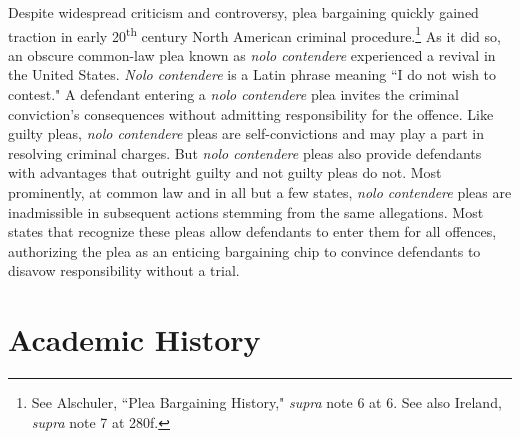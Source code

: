Despite widespread criticism and controversy, plea bargaining quickly gained traction in early 20\textsuperscript{th} century North American criminal procedure.\footnote{See Alschuler, ``Plea Bargaining History," \textit{supra} note 6 at 6. See also Ireland, \textit{supra} note 7 at 280f.} As it did so, an obscure common-law plea known as \textit{nolo contendere} experienced a revival in the United States. \textit{Nolo contendere} is a Latin phrase meaning ``I do not wish to contest." A defendant entering a \textit{nolo contendere} plea invites the criminal conviction's consequences without admitting responsibility for the offence. Like guilty pleas, \textit{nolo contendere} pleas are self-convictions and may play a part in resolving criminal charges. But \textit{nolo contendere} pleas also provide defendants with advantages that outright guilty and not guilty pleas do not. Most prominently, at common law and in all but a few states, \textit{nolo contendere} pleas are inadmissible in subsequent actions stemming from the same allegations. Most states that recognize these pleas allow defendants to enter them for all offences, authorizing the plea as an enticing bargaining chip to convince defendants to disavow responsibility without a trial.

\section{Academic History}

